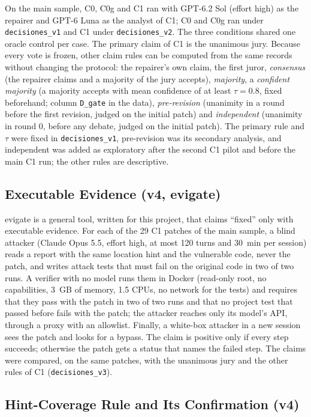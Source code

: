 \documentclass[ai,article,submit,oneauthor]{Definitions/mdpi}
\begin{document}
On the main sample, C0, C0g and C1 ran with GPT-6.2 Sol (effort high) as the repairer and GPT-6 Luna as the analyst of C1; C0 and C0g ran under \texttt{decisiones\_v1} and C1 under \texttt{decisiones\_v2}. The three conditions shared one oracle control per case. The primary claim of C1 is the unanimous jury. Because every vote is frozen, other claim rules can be computed from the same records without changing the protocol: the repairer's own claim, the first juror, \emph{consensus} (the repairer claims and a majority of the jury accepts), \emph{majority}, a \emph{confident majority} (a majority accepts with mean confidence of at least $\tau=0.8$, fixed beforehand; column \texttt{D\_gate} in the data), \emph{pre-revision} (unanimity in a round before the first revision, judged on the initial patch) and \emph{independent} (unanimity in round 0, before any debate, judged on the initial patch). The primary rule and $\tau$ were fixed in \texttt{decisiones\_v1}, pre-revision was its secondary analysis, and independent was added as exploratory after the second C1 pilot and before the main C1 run; the other rules are descriptive.

\subsection{Executable Evidence (v4, evigate)}\label{sec:evigate}

evigate is a general tool, written for this project, that claims ``fixed'' only with executable evidence. For each of the 29 C1 patches of the main sample, a blind attacker (Claude Opus 5.5, effort high, at most 120 turns and 30~min per session) reads a report with the same location hint and the vulnerable code, never the patch, and writes attack tests that must fail on the original code in two of two runs. A verifier with no model runs them in Docker (read-only root, no capabilities, 3~GB of memory, 1.5 CPUs, no network for the tests) and requires that they pass with the patch in two of two runs and that no project test that passed before fails with the patch; the attacker reaches only its model's API, through a proxy with an allowlist. Finally, a white-box attacker in a new session sees the patch and looks for a bypass. The claim is positive only if every step succeeds; otherwise the patch gets a status that names the failed step. The claims were compared, on the same patches, with the unanimous jury and the other rules of C1 (\texttt{decisiones\_v3}).

\subsection{Hint-Coverage Rule and Its Confirmation (v4)}\label{sec:coverage}
\end{document}
